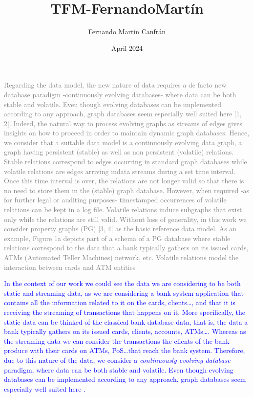 \documentclass{article}
\title{TFM-FernandoMartín}
\author{Fernando Martín Canfrán}
\date{April 2024}
\begin{document}
\textcolor{gray}{
Regarding the data model, the new nature of data requires a de facto new database paradigm
-continuously evolving databases- where data can be both stable and volatile. Even though
evolving databases can be implemented according to any approach, graph databases seem
especially well suited here [1, 2]. Indeed, the natural way to process evolving graphs as streams
of edges gives insights on how to proceed in order to maintain dynamic graph databases. Hence,
we consider that a suitable data model is a continuously evolving data graph, a graph having
persistent (stable) as well as non persistent (volatile) relations. Stable relations correspond
to edges occurring in standard graph databases while volatile relations are edges arriving indata streams during a set time interval. Once this time interval is over, the relations are not
longer valid so that there is no need to store them in the (stable) graph database. However,
when required -as for further legal or auditing purposes- timestamped occurrences of volatile
relations can be kept in a log file. Volatile relations induce subgraphs that exist only while the
relations are still valid. Without loss of generality, in this work we consider property graphs
(PG) [3, 4] as the basic reference data model. As an example, Figure 1a depicts part of a schema
of a PG database where stable relations correspond to the data that a bank typically gathers
on its issued cards, ATMs (Automated Teller Machines) network, etc. Volatile relations model
the interaction between cards and ATM entities}


\textcolor{blue}{In the context of our work we could see the data we are considering to be both static and streaming data, as we are considering a bank system application that contains all the information related to it on the cards, clients\dots, and that it is receiving the streaming of transactions that happens on it.
More specifically, the static data can be thinked of the classical bank database data, that is, the data a bank typically gathers on its issued cards, clients, accounts, ATMs\dots. Whereas as the streaming data we can consider the transactions the clients of the bank produce with their cards on ATMs, PoS\dots that reach the bank system.
Therefore, due to this nature of the data, we consider a \emph{continuously evolving database} paradigm, where data can be both stable and volatile. Even though 
evolving databases can be implemented according to any approach, graph databases seem especially well suited here \textcolor{blue}{\cite{angles2008survey, kumar2015graph}}. 
}
\end{document}
